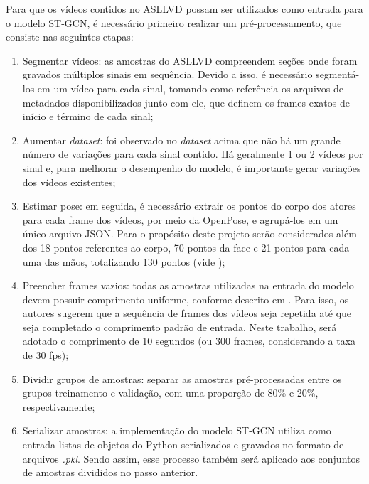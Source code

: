 Para que os vídeos contidos no ASLLVD possam ser utilizados como entrada para o modelo ST-GCN, é necessário primeiro realizar um pré-processamento, que consiste nas seguintes etapas:
\begin{enumerate}
    \item Segmentar vídeos: as amostras do  ASLLVD compreendem seções onde foram gravados múltiplos sinais em sequência. Devido a isso, é necessário segmentá-los em um vídeo para cada sinal, tomando como referência os arquivos de metadados disponibilizados junto com ele, que definem os frames exatos de início e término de cada sinal;
    \item Aumentar \textit{dataset}: foi observado no \textit{dataset} acima que não há um grande número de variações para cada sinal contido. Há geralmente 1 ou 2 vídeos por sinal e, para melhorar o desempenho do modelo, é importante gerar variações dos vídeos existentes;
    \item Estimar pose: em seguida, é necessário extrair os pontos do corpo dos atores para cada frame dos vídeos, por meio da OpenPose, e agrupá-los em um único arquivo JSON. Para o propósito deste projeto serão considerados além dos 18 pontos referentes ao corpo, 70 pontos da face e 21 pontos para cada uma das mãos, totalizando 130 pontos (vide  );
    \item Preencher frames vazios: todas as amostras utilizadas na entrada do modelo devem possuir comprimento uniforme, conforme descrito em \cite{st-gcn-2018}. Para isso, os autores sugerem que a sequência de frames dos vídeos seja repetida até que seja completado o comprimento padrão de entrada. Neste trabalho, será adotado o comprimento de 10 segundos (ou 300 frames, considerando a taxa de 30 fps);
    \item Dividir grupos de amostras: separar as amostras pré-processadas entre os grupos treinamento e validação, com uma proporção de 80\% e 20\%, respectivamente;
    \item Serializar amostras: a implementação do modelo ST-GCN utiliza como entrada listas de objetos do Python serializados e gravados no formato de arquivos \textit{.pkl}. Sendo assim, esse processo também será aplicado aos conjuntos de amostras divididos no passo anterior.
\end{enumerate}

